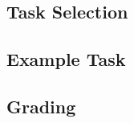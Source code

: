 \subsection{Task Selection}
\label{s:task_select}

\subsection{Example Task}
\label{s:task_example}

\subsection{Grading}
\label{s:grading}